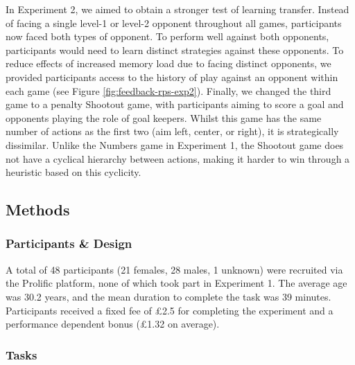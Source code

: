 \documentclass[smallextended]{svjour3}       %
\begin{document}
In Experiment 2, we aimed to obtain a stronger test of learning
transfer. Instead of facing a single level-1 or level-2 opponent
throughout all games, participants now faced both types of opponent. To
perform well against both opponents, participants would need to learn
distinct strategies against these opponents. To reduce effects of
increased memory load due to facing distinct opponents, we provided
participants access to the history of play against an opponent within
each game (see Figure \ref{fig:feedback-rps-exp2}). Finally, we changed
the third game to a penalty Shootout game, with participants aiming to
score a goal and opponents playing the role of goal keepers. Whilst this
game has the same number of actions as the first two (aim left, center,
or right), it is strategically dissimilar. Unlike the Numbers game in
Experiment 1, the Shootout game does not have a cyclical hierarchy
between actions, making it harder to win through a heuristic based on
this cyclicity.

\hypertarget{methods-1}{%
\subsection{Methods}\label{methods-1}}

\hypertarget{participants-design}{%
\subsubsection{Participants \& Design}\label{participants-design}}

A total of 48 participants (21 females, 28 males, 1 unknown) were
recruited via the Prolific platform, none of which took part in
Experiment 1. The average age was 30.2 years, and the mean duration to
complete the task was 39 minutes. Participants received a fixed fee of
£2.5 for completing the experiment and a performance dependent bonus
(£1.32 on average).

\hypertarget{tasks-1}{%
\subsubsection{Tasks}\label{tasks-1}}
\end{document}
